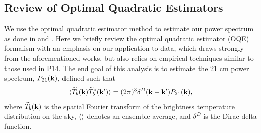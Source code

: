 \documentclass[twocolumn,numberedappendix]{emulateapj} \shorttitle{PSA64}
\begin{document}
%
%
\subsection{Review of Optimal Quadratic Estimators}
We use the optimal quadratic estimator method to estimate our power spectrum as
done in \citet{liu_tegmark2011} and \citet{dillon_et_al2013a}.  Here we briefly review the
optimal quadratic estimator (OQE) formalism with an emphasis on our application
to data, which draws strongly from the aforementioned works, but also relies on empirical
techniques similar to those used in P14. The end goal of this analysis is to estimate the 21 cm
power spectrum, $P_{21}(\mathbf{k})$, defined such that 
\begin{equation}
\label{eqn:pspec_def}
    \expval{\widetilde{T}_{b}(\k)\widetilde{T}^{*}_{b}(\k^{\prime})} =
            (2\pi)^{3}\delta^{D}(\k - \k^{\prime})P_{21}(\k),
\end{equation}
where $\widetilde{T}_{b}(\mathbf{k})$ is the spatial Fourier transform of the brightness temperature
distribution on the sky, $\langle  \rangle$ denotes an ensemble average, and
$\delta^{D}$ is the Dirac delta function. 
\end{document}
